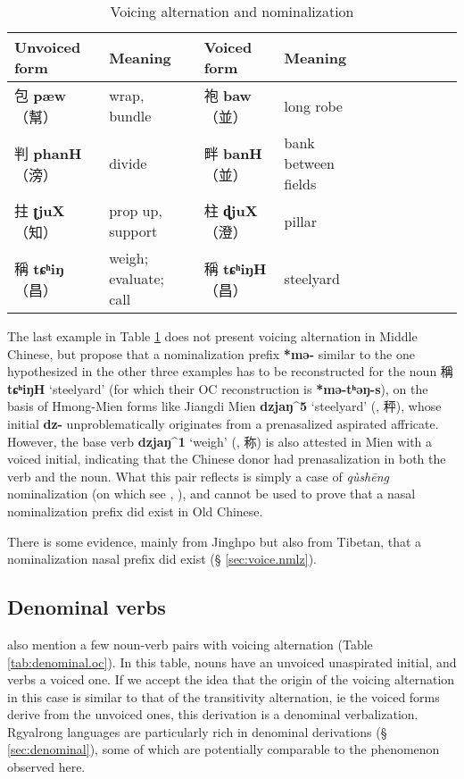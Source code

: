 \documentclass[oneside,a4paper,11pt]{article}
\newcommand{\ipa}[1]{\textbf{{\phon\mbox{#1}}}} %
\newcommand{\zh}[1]{{\cn #1}}
\newcommand{\zhc}[2]{\zh{#1} \ipa{#2}}
\newcommand{\mc}[1]{\zh{（#1）}}
\begin{document}
\begin{table}[H]
\caption{Voicing alternation and nominalization} \label{tab:nmlz.voicing.oc}
\begin{tabular}{llllllllll}
\toprule
Unvoiced form &Meaning & Voiced form & Meaning\\
\midrule
\zhc{包}{pæw} \mc{幫}	&wrap, bundle & \zhc{袍}{baw} \mc{並} & long robe \\
\zhc{判}{phanH} \mc{滂}	&divide & \zhc{畔}{banH} \mc{並} & bank between fields \\
\zhc{拄}{ʈjuX} \mc{知}	&prop up, support  & \zhc{柱}{ɖjuX} \mc{澄} & pillar \\
\zhc{稱}{tɕʰiŋ} \mc{昌}	&weigh; evaluate; call & \zhc{稱}{tɕʰiŋH} \mc{昌} & steelyard \\
\bottomrule
\end{tabular}
\end{table}

The last example in Table \ref{tab:nmlz.voicing.oc} does not present voicing alternation in Middle Chinese, but \citet{bs14oc} propose that a nominalization prefix \ipa{*mə-} similar to the one hypothesized in the other three examples has to be reconstructed for the noun \zhc{稱}{tɕʰiŋH} `steelyard' (for which their OC reconstruction is \ipa{*mə-tʰəŋ-s}), on the basis of Hmong-Mien forms like Jiangdi Mien \ipa{dzjaŋ^5} `steelyard' (\citealt[68]{maozw92mien}, \zh{秤}), whose initial \ipa{dz-} unproblematically originates from a prenasalized aspirated affricate. However, the base verb \ipa{dzjaŋ^1} `weigh' (\citealt[167]{maozw92mien}, \zh{称}) is also attested in Mien with a voiced initial, indicating that the Chinese donor had prenasalization in both the verb and the noun. What this pair reflects is simply a case of \textit{qùshēng} nominalization (on which see \citealt{downer59}, \citealt{jacques16ssuffixes}), and cannot be used to prove that a nasal nominalization prefix did exist in Old Chinese.

There is some evidence, mainly from Jinghpo but also from Tibetan, that a nominalization nasal prefix did exist (§ \ref{sec:voice.nmlz}).

\subsection{Denominal verbs}
\citet[55]{bs14oc} also mention a few noun-verb pairs with voicing alternation (Table \ref{tab:denominal.oc}). In this table, nouns have an unvoiced unaspirated initial, and  verbs a voiced one. If we accept the idea that the origin of the voicing alternation in this case is similar to that of the transitivity alternation, ie the voiced forms derive from the unvoiced ones, this derivation is a denominal verbalization. Rgyalrong languages are particularly rich in denominal derivations (§ \ref{sec:denominal}), some of which are potentially comparable to the phenomenon observed here.
\end{document}
